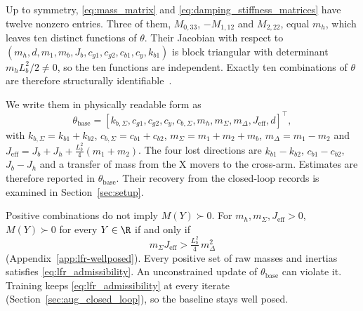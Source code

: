 Up to symmetry, \eqref{eq:mass_matrix} and \eqref{eq:damping_stiffness_matrices}
have twelve nonzero entries.
Three of them, $M_{0,33}$, $-M_{1,12}$ and $M_{2,22}$, equal $m_h$, which
leaves ten distinct functions of $\theta$.
Their Jacobian with respect to
$(m_h,d,m_1,m_b,J_b,c_{g1},c_{g2},c_{b1},c_y,k_{b1})$ is block triangular with
determinant $m_hL_b^2/2\neq0$, so the ten functions are independent.
Exactly ten combinations of $\theta$ are therefore structurally
identifiable~\cite[Def.~7]{ovchinnikov2021computing}.

We write them in physically readable form as
\begin{equation}
  \theta_{\mathrm{base}}=[k_{b,\Sigma},c_{g1},c_{g2},c_y,c_{b,\Sigma},
  m_h,m_\Sigma,m_\Delta,J_{\mathrm{eff}},d]^\top,
  \label{eq:phi}
\end{equation}
with $k_{b,\Sigma}=k_{b1}+k_{b2}$, $c_{b,\Sigma}=c_{b1}+c_{b2}$,
$m_\Sigma=m_1+m_2+m_b$, $m_\Delta=m_1-m_2$ and
$J_{\mathrm{eff}}=J_b+J_h+\tfrac{L_b^2}{4}(m_1+m_2)$.
The four lost directions are $k_{b1}-k_{b2}$, $c_{b1}-c_{b2}$, $J_b-J_h$ and a
transfer of mass from the X movers to the cross-arm.
Estimates are therefore reported in $\theta_{\mathrm{base}}$.
Their recovery from the closed-loop records is examined in
Section~\ref{sec:setup}.

Positive combinations do not imply $M(Y)\succ0$.
For $m_h,m_\Sigma,J_{\mathrm{eff}}>0$, $M(Y)\succ0$ for every $Y\in\R$ if and
only if
\begin{equation}
  m_\Sigma J_{\mathrm{eff}}>\tfrac{L_b^2}{4}\,m_\Delta^2
  \label{eq:lfr_admissibility}
\end{equation}
(Appendix~\ref{app:lfr-wellposed}).
Every positive set of raw masses and inertias satisfies
\eqref{eq:lfr_admissibility}.
An unconstrained update of $\theta_{\mathrm{base}}$ can violate it.
Training keeps \eqref{eq:lfr_admissibility} at every iterate
(Section~\ref{sec:aug_closed_loop}), so the baseline stays well posed.
